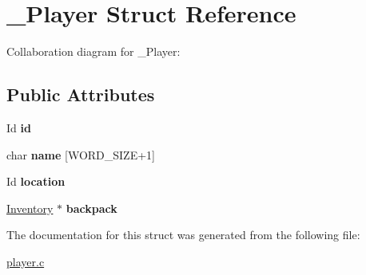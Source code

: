 \hypertarget{struct__Player}{}\section{\+\_\+\+Player Struct Reference}
\label{struct__Player}


Collaboration diagram for \+\_\+\+Player\+:
\subsection*{Public Attributes}
\begin{DoxyCompactItemize}
\item 
\mbox{\label{struct__Player_a60d635cd063816a9c1bd873f4868bb90}} 
Id {\bfseries id}
\item 
\mbox{\label{struct__Player_ac89715f913cc607b75eb7236765c41f5}} 
char {\bfseries name} \mbox{[}W\+O\+R\+D\+\_\+\+S\+I\+ZE+1\mbox{]}
\item 
\mbox{\label{struct__Player_adbb6195d15b88f3f658e74274eff52d8}} 
Id {\bfseries location}
\item 
\mbox{\label{struct__Player_a566b4fc26d28f33d9bd2a1743ae6c067}} 
\hyperlink{struct__Inventory}{Inventory} $\ast$ {\bfseries backpack}
\end{DoxyCompactItemize}


The documentation for this struct was generated from the following file\+:\begin{DoxyCompactItemize}
\item 
\hyperlink{player_8c}{player.\+c}\end{DoxyCompactItemize}
